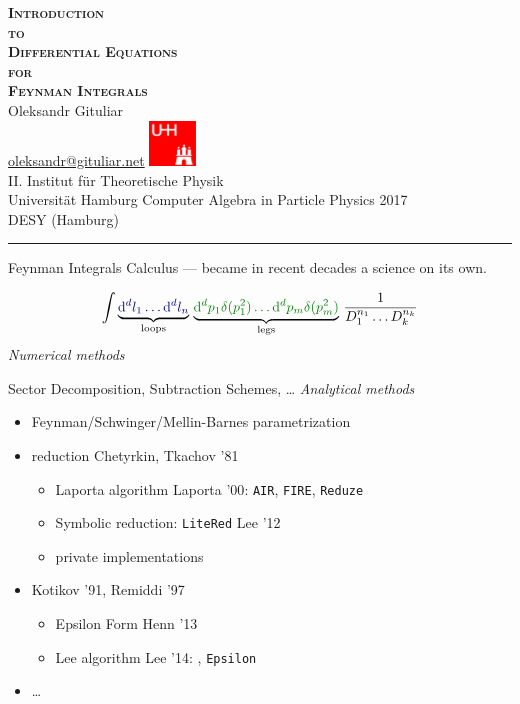 \documentclass[11pt]{article}
\newcommand{\titleb}[2]{{\color{Blue}{\LARGE #1}\hfill{\Large #2}\vspace{-2mm}\par\rule{\textwidth}{1pt}\vs}}
\newcommand{\titlea}[1]{\titleb{#1}{}}
\newcommand{\people}[1]{{\color{Magenta}#1}}
\begin{document}
\color{text}

\begin{center}
  \mbox{}
  \vfill
  {\LARGE \bf \scshape Introduction \\ \Large to \LARGE \\ Differential Equations \\ \Large for \LARGE \\ Feynman Integrals \\}
  \vfill
  {\large Oleksandr Gituliar} \\ \href{mailto:oleksandr@gituliar.net}{oleksandr@gituliar.net}
  \vfill
  \includegraphics[height=1.2cm]{img/logo_uhh}\\
  II. Institut f\"ur Theoretische Physik \\ Universit\"at Hamburg
  \vfill
  {Computer Algebra in Particle Physics 2017 \\ DESY (Hamburg)}
  \vfill
  \mbox{}
\end{center}
\newpage


\titlea{Introduction}

Feynman Integrals Calculus --- became in recent decades a science on its own. 

  \begin{equation*}
    \int {\color{Black}\underbrace{ \color{NavyBlue}\D^d l_1 \ldots \D^d l_n}_{\text{loops}}} \,\, 
         {\color{Black}\underbrace{\color{Green} \D^d p_1 \delta(p_1^2) \ldots \D^d p_m \delta(p_m^2)}_{\text{legs}}} \,\, \frac{1}{D_1^{n_1} \ldots D_k^{n_k}}
  \end{equation*}
    {\em Numerical methods}
    \bi
       \item Sector Decomposition, Subtraction Schemes, \ldots
    \ei
    {\em Analytical methods}
    \begin{itemize}
      \item Feynman/Schwinger/Mellin-Barnes parametrization
      \item {} reduction \people{Chetyrkin, Tkachov '81}
      \begin{itemize}
        \item Laporta algorithm \people{Laporta '00}: \texttt{AIR}, \texttt{FIRE}, \texttt{Reduze}
        \item Symbolic reduction: \texttt{LiteRed} \people{Lee '12}
        \item private implementations
      \end{itemize}
      \item {} \people{Kotikov '91, Remiddi '97}
      \begin{itemize}
        \item Epsilon Form \people{Henn '13}
        \item Lee algorithm \people{Lee '14}: \fuchsia, \texttt{Epsilon}
      \end{itemize}
      \item \ldots
    \end{itemize}
\newpage
\end{document}
